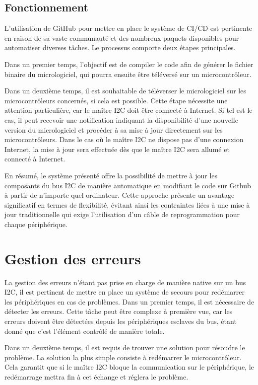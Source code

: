 \subsection{Fonctionnement}

L'utilisation de GitHub pour mettre en place le système de CI/CD est pertinente en raison de sa vaste communauté et des nombreux paquets disponibles pour automatiser diverses tâches.
Le processus comporte deux étapes principales.

Dans un premier temps, l'objectif est de compiler le code afin de générer le fichier binaire du micrologiciel, qui pourra ensuite être téléversé sur un microcontrôleur.

Dans un deuxième temps, il est souhaitable de téléverser le micrologiciel sur les microcontrôleurs concernés, si cela est possible.
Cette étape nécessite une attention particulière, car le maître I2C doit être connecté à Internet.
Si tel est le cas, il peut recevoir une notification indiquant la disponibilité d'une nouvelle version du micrologiciel et procéder à sa mise à jour directement sur les microcontrôleurs. Dans le cas où le maître I2C ne dispose pas d'une connexion Internet, la mise à jour sera effectuée dès que le maître I2C sera allumé et connecté à Internet.

En résumé, le système présenté offre la possibilité de mettre à jour les composants du bus I2C de manière automatique en modifiant le code sur Github à partir de n'importe quel ordinateur.
Cette approche présente un avantage significatif en termes de flexibilité, évitant ainsi les contraintes liées à une mise à jour traditionnelle qui exige l'utilisation d'un câble de reprogrammation pour chaque périphérique.

\section{Gestion des erreurs}

La gestion des erreurs n'étant pas prise en charge de manière native sur un bus I2C, il est pertinent de mettre en place un système de secours pour redémarrer les périphériques en cas de problèmes.
Dans un premier temps, il est nécessaire de détecter les erreurs.
Cette tâche peut être complexe à première vue, car les erreurs doivent être détectées depuis les périphériques esclaves du bus, étant donné que c'est l'élément contrôlé de manière totale.

Dans un deuxième temps, il est requis de trouver une solution pour résoudre le problème.
La solution la plus simple consiste à redémarrer le microcontrôleur.
Cela garantit que si le maître I2C bloque la communication sur le périphérique, le redémarrage mettra fin à cet échange et réglera le problème.

